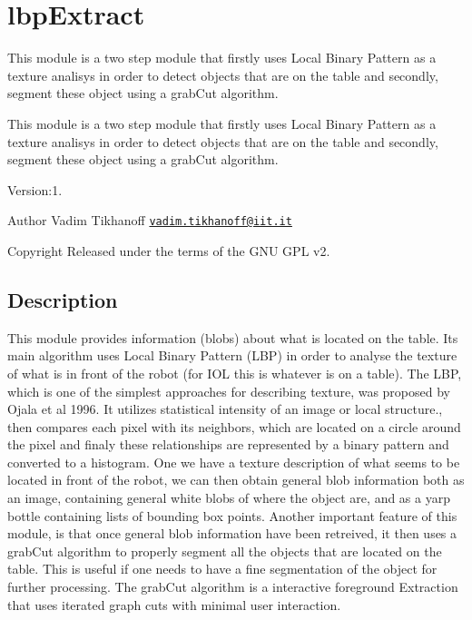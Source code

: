 \section{lbp\+Extract}
\label{group__lbpExtract}


This module is a two step module that firstly uses Local Binary Pattern as a texture analisys in order to detect objects that are on the table and secondly, segment these object using a grab\+Cut algorithm.  


This module is a two step module that firstly uses Local Binary Pattern as a texture analisys in order to detect objects that are on the table and secondly, segment these object using a grab\+Cut algorithm. 

Version\+:1. \begin{DoxyAuthor}{Author}
Vadim Tikhanoff \href{mailto:vadim.tikhanoff@iit.it}{\tt vadim.\+tikhanoff@iit.\+it} ~\newline
 
\end{DoxyAuthor}
\begin{DoxyCopyright}{Copyright}
Released under the terms of the G\+NU G\+PL v2. 
\end{DoxyCopyright}
\hypertarget{group__seg2cloud_intro_sec}{}\subsection{Description}\label{group__seg2cloud_intro_sec}
\begin{DoxyVerb}This module provides information (blobs) about what is located on the table. Its main algorithm uses Local Binary Pattern (LBP) in order to analyse the texture of what is in front of the robot (for IOL this is whatever is on a table). The LBP, which is one of the simplest approaches for describing texture, was proposed by Ojala et al 1996. It utilizes statistical intensity of an image or local structure., then compares each pixel with its neighbors, which are located on a circle around the pixel and finaly these relationships are represented by a binary pattern and converted to a histogram. One we have a texture description of what seems to be located in front of the robot, we can then obtain general blob information both as an image, containing general white blobs of where the object are, and as a yarp bottle containing lists of bounding box points.
Another important feature of this module, is that once general blob information have been retreived, it then uses a grabCut algorithm to properly segment all the objects that are located on the table. This is useful if one needs to have a fine segmentation of the object for further processing. The grabCut algorithm is a interactive foreground Extraction that uses iterated graph cuts with minimal user interaction.
\end{DoxyVerb}


